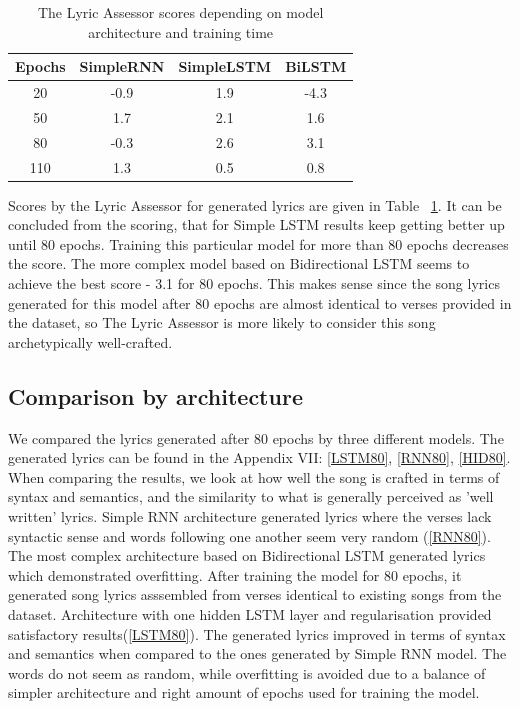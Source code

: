\documentclass[conference]{IEEEtran}
\begin{document}
\begin{table}[ht]
\caption{The Lyric Assessor scores depending on model architecture and training time} %
\centering %
\begin{tabular}{c c c c} %
\hline\hline %
Epochs & SimpleRNN & SimpleLSTM & BiLSTM\\ [0.5ex] %
\hline %
20 & -0.9 & 1.9 & -4.3 \\ %
50 & 1.7 & 2.1 & 1.6 \\
80 & -0.3 & 2.6 & 3.1 \\
110 & 1.3 & 0.5 & 0.8 \\[1ex]
\hline %
\end{tabular}
\label{table:scores} %
\end{table}

Scores by the Lyric Assessor for generated lyrics  are given in Table ~\ref{table:scores}. It can be concluded from the scoring, 
that for Simple LSTM results keep getting better up until 80 epochs. Training this particular model for more than 80 epochs decreases the score.
The more complex model based on Bidirectional LSTM seems to achieve the best score - 3.1 for 80 epochs. This makes sense since the song lyrics 
generated for this model after 80 epochs are almost identical to verses provided in the dataset, so The Lyric Assessor is more likely to consider 
this song archetypically well-crafted.

\subsection{Comparison by architecture}
We compared the lyrics generated after 80 epochs by three different models. The generated lyrics can be found in the Appendix VII: \ref{LSTM80}, \ref{RNN80}, \ref{HID80}.
When comparing the results, we look at how well the song is crafted in terms of syntax and semantics, and the similarity to what is generally perceived as 'well written' lyrics. 
Simple RNN architecture generated lyrics where the verses lack syntactic sense and words following one another seem very random (\ref{RNN80}). 
The most complex architecture based on Bidirectional LSTM generated lyrics which demonstrated overfitting. After training the model for 80 epochs, it generated song lyrics asssembled from verses identical to existing songs from the dataset.
Architecture with one hidden LSTM layer and regularisation provided satisfactory results(\ref{LSTM80}). The generated lyrics improved in terms of syntax and semantics when compared to the ones generated by Simple RNN model. The words do not seem as random, while overfitting is avoided due to a balance of simpler architecture and right amount of epochs used for training the model.
\end{document}
